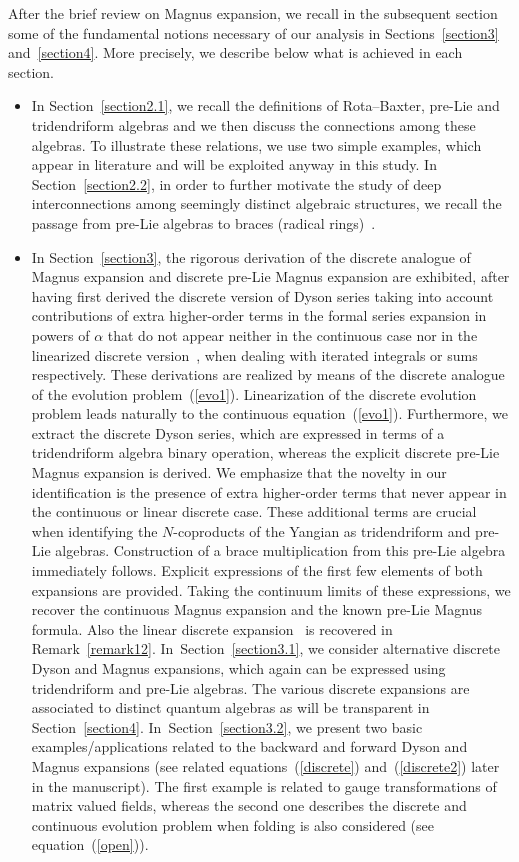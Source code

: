 \documentclass[10pt,a4paper]{amsart}
\numberwithin{equation}{section}
\theoremstyle{definition}
\begin{document}
After the brief review on Magnus expansion, we recall in the subsequent section some of the fundamental notions necessary of our analysis in Sections~\ref{section3} and~\ref{section4}. More precisely, we describe below what is achieved in each section.
\begin{itemize}\itemsep=0pt
\item In Section~\ref{section2.1}, we recall the definitions of Rota--Baxter, pre-Lie and tridendriform algebras and we then discuss the connections among these algebras. To illustrate these relations, we use two simple examples, which appear in literature and will be exploited anyway in this study. In Section~\ref{section2.2}, in order to further motivate the study of deep interconnections among seemingly distinct algebraic structures, we recall the passage from pre-Lie algebras to braces (radical rings)~\cite{Rump, Smok1, Smok2}.

 \item In Section~\ref{section3}, the rigorous derivation of the discrete analogue of Magnus expansion and discrete pre-Lie Magnus expansion are exhibited, after having first derived the discrete version of Dyson series taking into account contributions of extra higher-order terms in the formal series expansion in powers of $\alpha$ that do not appear neither in the continuous case nor in the linearized discrete version~\cite{EbraMan}, when dealing with iterated integrals or sums respectively. These derivations are realized by means of the discrete analogue of the evolution problem~(\ref{evo1}). Linearization of the discrete evolution problem leads naturally to the continuous equation~(\ref{evo1}). Furthermore, we extract the discrete Dyson series, which are expressed in terms of a tridendriform algebra binary operation, whereas the explicit discrete pre-Lie Magnus expansion is derived.
 We emphasize that the novelty in our identification is the presence of extra higher-order terms that never appear in the continuous or linear discrete case. These additional terms are crucial when identifying the $N$-coproducts of the Yangian as tridendriform and pre-Lie algebras. Construction of a brace multiplication from this pre-Lie algebra immediately follows. Explicit expressions of the first few elements of both expansions are provided. Taking the continuum limits of these expressions, we recover the continuous Magnus expansion and the known pre-Lie Magnus formula. Also the linear discrete expansion~\cite{EbraMan} is recovered in Remark~\ref{remark12}. In~Section~\ref{section3.1}, we consider alternative discrete Dyson and Magnus expansions, which again can be expressed using tridendriform and pre-Lie algebras. The various discrete expansions are associated to distinct quantum algebras as will be transparent in Section~\ref{section4}. In~Section~\ref{section3.2}, we present two basic examples/applications related to the backward and forward Dyson and Magnus expansions (see related equations~(\ref{discrete}) and~(\ref{discrete2}) later in the manuscript). The first example is related to gauge transformations of matrix valued fields, whereas the second one describes the discrete and continuous evolution problem when folding is also considered (see equation~(\ref{open})).


\end{itemize}
\end{document}
